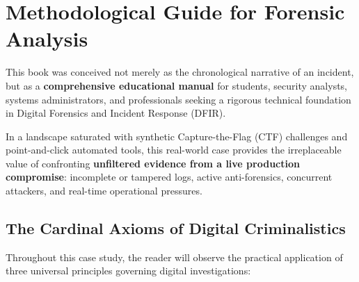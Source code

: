 \chapter*{Methodological Guide for Forensic Analysis}

This book was conceived not merely as the chronological narrative of an incident, but as a \textbf{comprehensive educational manual} for students, security analysts, systems administrators, and professionals seeking a rigorous technical foundation in Digital Forensics and Incident Response (DFIR).

In a landscape saturated with synthetic Capture-the-Flag (CTF) challenges and point-and-click automated tools, this real-world case provides the irreplaceable value of confronting \textbf{unfiltered evidence from a live production compromise}: incomplete or tampered logs, active anti-forensics, concurrent attackers, and real-time operational pressures.

\section*{The Cardinal Axioms of Digital Criminalistics}

Throughout this case study, the reader will observe the practical application of three universal principles governing digital investigations:

